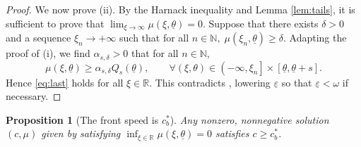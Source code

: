 \documentclass[11pt]{article}    %
\newcommand{\EB}[1]{\textcolor{blue}{#1}}
\newtheorem{proposition}[theorem]{Proposition}
\newcommand{\R}{\mathbb{R}}
\newcommand{\N}{\mathbb{N}}
\newcommand{\eps}{\varepsilon}
\begin{document}
\begin{proof}
We now prove (ii). By the Harnack inequality and Lemma \ref{lem:tails}, it is sufficient to prove that $\lim_{\xi \to \infty}\mu(\xi,\underline\theta) = 0$. Suppose that there exists $\delta>0$ and a sequence $\xi_n \to + \infty$ such that for all $n \in \N, \;\mu(\xi_n,\underline\theta)\geq \delta$. Adapting the proof of (i), we find $\alpha_{s,\delta}>0$ that for all $n \in \N$,
\begin{equation}\label{eq:last}
\mu(\xi,\underline\theta) \geq \alpha_{s,\delta} Q_s(\underline\theta), \qquad \forall (\xi,\theta) \in \left( -\infty , \xi_n \right] \times [\underline\theta,\underline\theta + s].
\end{equation}
Hence \eqref{eq:last} holds for all $\xi \in \R$.  This contradicts , lowering $\underline\eps$ so that $\underline \eps < \omega$ if necessary.
\end{proof}






















\begin{proposition}[The front speed is $c_b^*$]\label{prop:minspeed}
%
%
Any nonzero, nonnegative solution $(c,\mu)$ given by  satisfying $\inf_{\xi\in\R} \mu(\xi,\underline\theta) = 0$ satisfies $c \geq c_b^*$.
\end{proposition}
\end{document}
